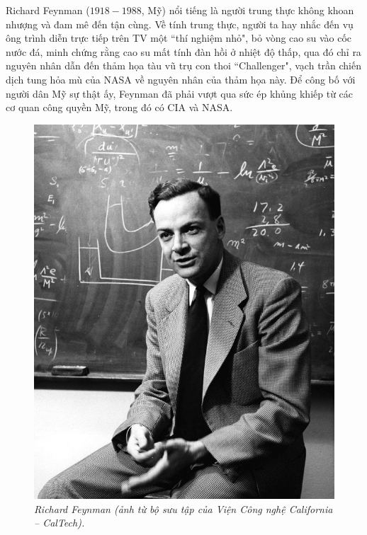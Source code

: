 \begin{multicols}{2}
	Richard Feynman ($1918-1988$, Mỹ) nổi tiếng là người trung thực không khoan nhượng và đam mê đến tận cùng. Về tính trung thực, người ta hay nhắc đến vụ ông trình diễn trực tiếp trên TV một ``thí nghiệm nhỏ", bỏ vòng cao su vào cốc nước đá, minh chứng rằng cao su mất tính đàn hồi ở nhiệt độ thấp, qua đó chỉ ra nguyên nhân dẫn đến thảm họa tàu vũ trụ con thoi ``Challenger", vạch trần chiến dịch tung hỏa mù của NASA về nguyên nhân của thảm họa này. Để công bố với người dân Mỹ sự thật ấy, Feynman đã phải vượt qua sức ép khủng khiếp từ các cơ quan công quyền Mỹ, trong đó có CIA và NASA. 
	\begin{figure}[H]
			\vspace*{-5pt}
			\centering
			\captionsetup{labelformat= empty, justification=centering}
			\includegraphics[width= 1\linewidth]{1a}
			\caption{\small\textit{\color{quantoan}Richard Feynman (ảnh từ bộ sưu tập của Viện Công nghệ California -- CalTech).}}
			\vspace*{-10pt}
		\end{figure}

\end{multicols}
